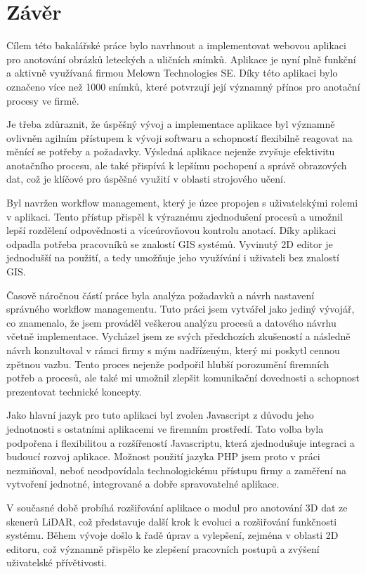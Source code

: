 \chapter{Závěr}

Cílem této bakalářské práce bylo navrhnout a implementovat webovou aplikaci pro anotování obrázků leteckých a uličních snímků. Aplikace je nyní plně funkční a aktivně využívaná firmou Melown Technologies SE. Díky této aplikaci bylo označeno více než 1000 snímků, které potvrzují její významný přínos pro anotační procesy ve firmě.

Je třeba zdůraznit, že úspěšný vývoj a implementace aplikace byl významně ovlivněn agilním přístupem k vývoji softwaru a schopností flexibilně reagovat na měnící se potřeby a požadavky. Výsledná aplikace nejenže zvyšuje efektivitu anotačního procesu, ale také přispívá k lepšímu pochopení a správě obrazových dat, což je klíčové pro úspěšné využití v oblasti strojového učení.

Byl navržen workflow management, který je úzce propojen s uživatelskými rolemi v aplikaci. Tento přístup přispěl k výraznému zjednodušení procesů a umožnil lepší rozdělení odpovědnosti a víceúrovňovou kontrolu anotací. Díky aplikaci odpadla potřeba pracovníků se znalostí GIS systémů. Vyvinutý 2D editor je jednodušší na použití, a tedy umožňuje jeho využívání i uživateli bez znalostí GIS.

Časově náročnou částí práce byla analýza požadavků a návrh nastavení správného workflow managementu. Tuto práci jsem vytvářel jako jediný vývojář, co znamenalo, že jsem prováděl veškerou analýzu procesů a datového návrhu včetně implementace. Vycházel jsem ze svých předchozích zkušeností a následně návrh konzultoval v rámci firmy s mým nadřízeným, který mi poskytl cennou zpětnou vazbu. Tento proces nejenže podpořil hlubší porozumění firemních potřeb a procesů, ale také mi umožnil zlepšit komunikační dovednosti a schopnost prezentovat technické koncepty.

Jako hlavní jazyk pro tuto aplikaci byl zvolen Javascript z důvodu jeho jednotnosti s ostatními aplikacemi ve firemním prostředí. Tato volba byla podpořena i flexibilitou a rozšířeností Javascriptu, která zjednodušuje integraci a budoucí rozvoj aplikace. Možnost použití jazyka PHP jsem proto v práci nezmiňoval, neboť neodpovídala technologickému přístupu firmy a zaměření na vytvoření jednotné, integrované a dobře spravovatelné aplikace.

V současné době probíhá rozšiřování aplikace o modul pro anotování 3D dat ze skenerů LiDAR, což představuje další krok k evoluci a rozšiřování funkčnosti systému. Během vývoje došlo k řadě úprav a vylepšení, zejména v oblasti 2D editoru, což významně přispělo ke zlepšení pracovních postupů a zvýšení uživatelské přívětivosti.

